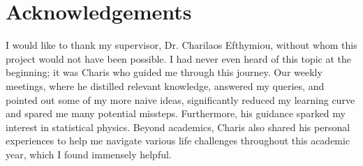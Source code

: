 {
\section*{Acknowledgements}
I would like to thank my supervisor, Dr. Charilaos Efthymiou, without whom this project would not have been possible. I had never even heard of this topic at the beginning; it was Charis who guided me through this journey. Our weekly meetings, where he distilled relevant knowledge, answered my queries, and pointed out some of my more naive ideas, significantly reduced my learning curve and spared me many potential missteps. Furthermore, his guidance sparked my interest in statistical physics. Beyond academics, Charis also shared his personal experiences to help me navigate various life challenges throughout this academic year, which I found immensely helpful.
}
